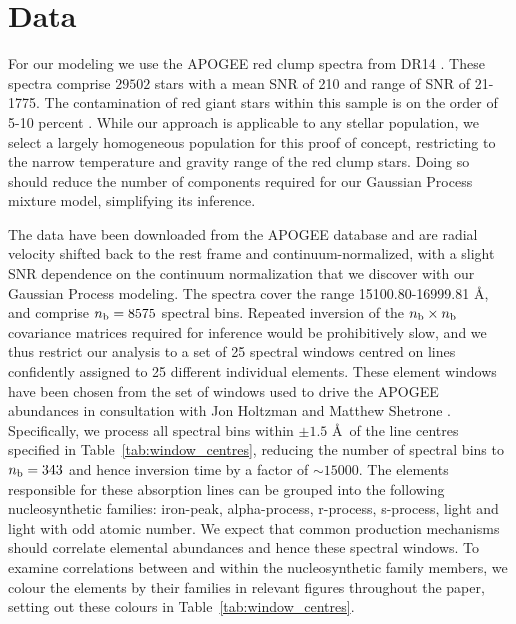 \documentclass[a4paper,fleqn,usenatbib]{mnras}
\newcommand{\nb}{n_{\rm b}}
\begin{document}


\section{Data}
\label{sec:data}

For our modeling we use the APOGEE red clump spectra from DR14 \citep{Majewski2017, Bovy2015}. These spectra comprise $29502$ stars with a mean SNR of 210 and range of SNR of 21-1775.  The contamination of red giant stars within this sample is on the order of 5-10 percent \citep{Bovy2015}. While our approach is applicable to any stellar population, we select a largely homogeneous population for this proof of concept, restricting to the narrow temperature and gravity range of the red clump stars. Doing so should reduce the number of components required for our Gaussian Process mixture model, simplifying its inference.

The data have been downloaded from the APOGEE database and are radial velocity shifted back to the rest frame and continuum-normalized, with a slight SNR dependence on the continuum normalization that we discover with our Gaussian Process modeling. The spectra cover the range 15100.80-16999.81 \AA, and comprise $\nb = 8575$ spectral bins. Repeated inversion of the $\nb \times \nb$ covariance matrices required for inference would be prohibitively slow, and we thus restrict our analysis to a set of 25 spectral windows centred on lines confidently assigned to 25 different individual elements. These element windows have been chosen from the set of windows used to drive the APOGEE abundances in consultation with Jon Holtzman and Matthew Shetrone \citep{Holtzman2015, Shetrone2015}. Specifically, we process all spectral bins within $\pm 1.5$ \AA\ of the line centres specified in Table~\ref{tab:window_centres}, reducing the number of spectral bins to $\nb = 343$ and hence inversion time by a factor of $\sim15000$. The elements responsible for these absorption lines can be grouped into the following nucleosynthetic families: iron-peak, alpha-process, r-process, s-process, light and light with odd atomic number. We expect that common production mechanisms should correlate elemental abundances and hence these spectral windows. To examine correlations between and within the nucleosynthetic family members, we colour the elements by their families in relevant figures throughout the paper, setting out these colours in Table~\ref{tab:window_centres}.
\end{document}
